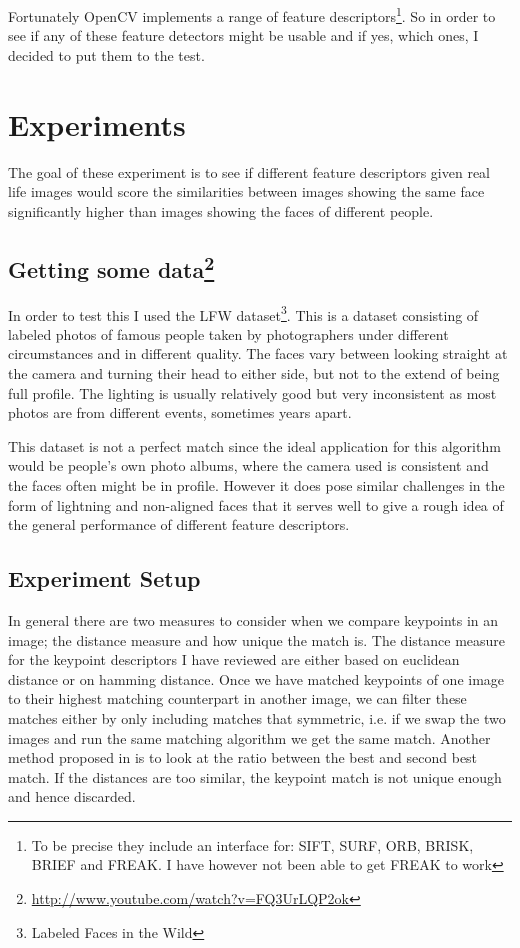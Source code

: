 \documentclass{article}
\begin{document}
Fortunately OpenCV implements a range of feature descriptors\footnote{To be 
precise they include an interface for: SIFT, SURF, ORB, BRISK, BRIEF and FREAK.  
I have however not been able to get FREAK to work}. So in order to see if any 
of these feature detectors might be usable and if yes, which ones, I decided to 
put them to the test.

\section{Experiments}
The goal of these experiment is to see if different feature descriptors given 
real life images would score the similarities between images showing the same 
face significantly higher than images showing the faces of different people.  

\subsection{Getting some data\footnote{%
\href{http://www.youtube.com/watch?v=FQ3UrLQP2ok}{http://www.youtube.com/watch?v=FQ3UrLQP2ok}}}
In order to test this I used the LFW dataset\footnote{Labeled Faces in the 
Wild}.  This is a dataset consisting of labeled photos of famous people taken 
by photographers under different circumstances and in different quality. The 
faces vary between looking straight at the camera and turning their head to 
either side, but not to the extend of being full profile. The lighting is 
usually relatively good but very inconsistent as most photos are from different 
events, sometimes years apart.

This dataset is not a perfect match since the ideal application for this 
algorithm would be people's own photo albums, where the camera used is 
consistent and the faces often might be in profile. However it does pose 
similar challenges in the form of lightning and non-aligned faces that it 
serves well to give a rough idea of the general performance of different 
feature descriptors.

\subsection{Experiment Setup}

In general there are two measures to consider when we compare keypoints in an 
image; the distance measure and how unique the match is. The distance measure 
for the keypoint descriptors I have reviewed are either based on euclidean 
distance or on hamming distance. Once we have matched keypoints of one image to 
their highest matching counterpart in another image, we can filter these 
matches either by only including matches that symmetric, i.e. if we swap the 
two images and run the same matching algorithm we get the same match. Another 
method proposed in \cite{lowe2004sift} is to look at the ratio between the best 
and second best match. If the distances are too similar, the keypoint match is 
not unique enough and hence discarded.
\end{document}
